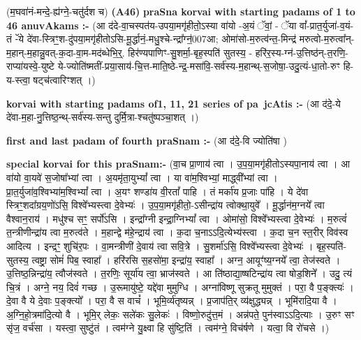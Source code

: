\documentclass[17pt]{extarticle}
\begin{document}
                  \newline
                      (म॒घवा॑नं-मन्दे॒-ह्य॑ग्ने॒-चतु॑र्दश च)  \textbf{(A46)} \newline \newline
\textbf{praSna korvai with starting padams of 1 to 46 anuvAkams :-} \newline
(आ द॑दे-वा॒चस्पत॑य-उपया॒मगृ॑हीतो॒ऽस्या वा॑यो -अ॒यं ॅवां॒ - ॅया वां᳚-प्रात॒र्युजा॑-व॒यं-तं -ॅये दे॑वा-स्त्रिꣳ॒॒श-दु॑पया॒मगृ॑हीतोऽसि-मू॒र्द्धानं॒-मधु॒श्चे-न्द्रा᳚ग्न॒॑007आ; ओमा॑सो-म॒रुत्व॑न्त॒-मिन्द्र॑ मरुत्वो-म॒रुत्वा᳚न्- म॒हान्-म॒हान्नु॒वत्-क॒दा-वा॒म-मद॑ब्धेभि॒र्॒. हिर॑ण्यपाणिꣳ-सु॒शर्मा॒-बृह॒स्पति॑ सुतस्य॒ - हरि॑र॒स्य-ग्न॑-उ॒त्तिष्ठ॑न्-त॒रणि॒- राप्या॑यस्वे॒-युष्टे ये-ज्योति॑ष्मतीं-प्रया॒साय॑-चि॒त्त-माति॒ष्ठे-न्द्र॒-मसा॑वि॒-सर्व॑स्य-म॒हान्थ्-स॒जोषा॒-उदु॒त्यं-धा॒तो-रुꣳ हि-य-स्त्वा॒ षट्च॑त्वारिꣳशत् ।) \newline

\textbf{korvai with starting padams of1, 11, 21 series of pa~jcAtis :-} \newline
(आ द॑दे॒-ये दे॑वा-म॒हा-नु॒त्तिष्ठ॒न्थ्-सर्व॑स्य-सन्तु दुर्मि॒त्रा-श्चतु॑ष्पञ्चा॒शत् ।) \newline

\textbf{first and last padam of fourth praSnam :-} \newline
(आ द॑दे॒-वि ज्योति॑षा ) \newline 

    \textbf{special korvai for this praSnam:-} \newline
    (वा॒च प्रा॒णाय॑ त्वा । उ॒प॒या॒मगृ॑हीतोऽस्यपा॒नाय॑ त्वा । आ वा॑यो वा॒यवे॑ स॒जोषा᳚भ्यां त्वा । अ॒यमृ॑ता॒युभ्यां᳚ त्वा । या वा॑म॒श्विभ्यां॒ माद्ध्वी᳚भ्यां त्वा । प्रा॒त॒र्युजा॑व॒श्विभ्या॑म॒श्विभ्यां᳚ त्वा । अ॒यꣳ शण्डा॑य वी॒रतां᳚ पाहि । तं मर्का॑य प्र॒जाः पा॑हि । ये दे॑वा स्त्रिꣳ॒॒शदा᳚ग्रय॒णो॑ऽसि॒ विश्वे᳚भ्यस्त्वा दे॒वेभ्यः॑ । उ॒प॒या॒मगृ॑हीतो॒-ऽसीन्द्रा॑य त्वोक्था॒युवे᳚ । मू॒र्द्धान॑म॒ग्नये᳚ त्वा वैश्वान॒राय॑ । मधु॑श्च सꣳ॒॒ सर्पो॑ऽसि । इन्द्रा᳚ग्नी इन्द्रा॒ग्निभ्यां᳚ त्वा । ओमा॑सो॒ विश्वे᳚भ्यस्त्वा दे॒वेभ्यः॑ । म॒रुत्वं॑ त॒न्त्रीणीन्द्रा॑य त्वा म॒रुत्व॑ते । म॒हान्द्वे म॑हे॒न्द्राय॑ त्वा । क॒दा च॒नाऽऽदि॒त्येभ्य॑स्त्वा । क॒दा च॒न स्त॒रीर् विव॑स्व आदित्य । इन्द्रꣳ॒॒ शुचि॑र॒पः । वा॒मन्त्रीणी॑ दे॒वाय॑ त्वा सवि॒त्रे । सु॒शर्मा॑ऽसि॒ विश्वे᳚भ्यस्त्वा दे॒वेभ्यः॑ । बृह॒स्पति॑-सुतस्य॒ त्वष्ट्रा॒ सोमं॑ पिब॒ स्वाहा᳚ । हरि॑रसि स॒हसो॑मा॒ इन्द्रा॑य॒ स्वाहा᳚ । अग्न॒ आयूꣳ॑ष्य॒ग्नये᳚ त्वा॒ तेज॑स्वते । उ॒त्तिष्ठ॒न्निन्द्रा॑य॒ त्वौज॑स्वते । त॒रणिः॒ सूर्या॑य त्वा॒ भ्राज॑स्वते । आ ति॑ष्ठाद्या॒ष्षटिन्द्रा॑य त्वा षोड॒शिने᳚ । उदु॒ त्यं चि॒त्रं । अग्ने॒ नय॒ दिवं॑ गच्छ । उ॒रूमायु॑ष्टे॒ यद्दे॑वा मुमुग्धि । अग्ना॑विष्णू सुक्रतू मुमुक्तं । परा॒ वै प॒ङ्क्त्यः॑ । दे॒वा वै ये दे॒वाः प॒ङ्क्त्यो᳚ । परा॒ वै स वाचं᳚ । भूमि॒र्व्य॑तृष्यन्न् । प्र॒जाप॑ति॒र् व्य॑क्षुद्ध्यन्न् । भूमि॑रादि॒या वै । अ॒ग्नि॒हो॒त्रमा॑दि॒त्यो वै । भूमि॒र् लेकः॒ सले॑कः सु॒लेकः॑ । विष्णो॒रुदु॑त्त॒मं । अन्न॑पते॒ पुन॑स्वाऽऽदि॒त्याः । उ॒रुꣳ सꣳ सृ॑ज॒ वर्च॑सा । यस्त्वा॒ सुष्टु॑तं । त्वम॑ग्ने यु॒क्ष्वा हि सु॑ष्टि॒तिं । त्वम॑ग्ने॒ विच॑र्षणे । यत्वा॒ वि रो॑चसे ।) \newline
\end{document}
